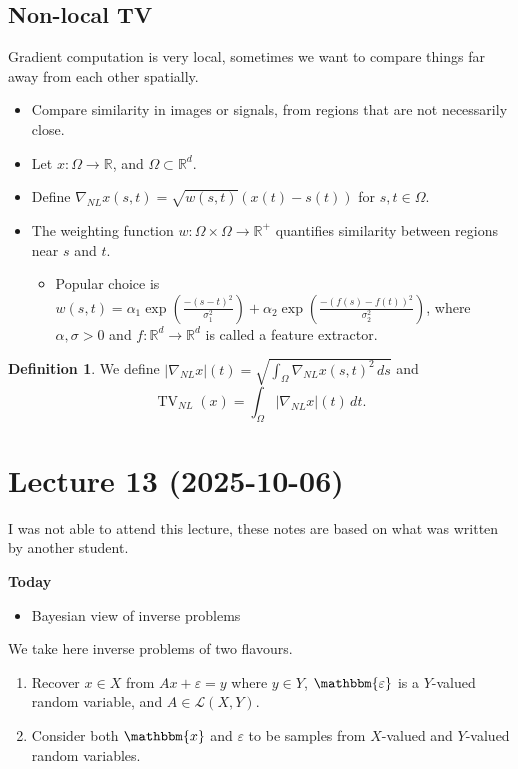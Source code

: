 \documentclass[12pt]{article}
\theoremstyle{definition}
\newtheorem{definition}{Definition}[section]
\newcommand{\real}{\mathbb{R}}   %
\newcommand{\abs}[1]{\left|#1\right|}
\DeclareMathOperator{\TV}{TV}
\begin{document}
\subsection{Non-local TV}
Gradient computation is very local, sometimes we want to compare things far away from each other spatially. 
\begin{itemize}
    \item Compare similarity in images or signals, from regions that are not necessarily close. 
    \item Let $x:\Omega\to\real$, and $\Omega\subset \real^d$. 
    \item Define $\nabla_{NL}x(s,t) = \sqrt{w(s,t)}(x(t)-s(t))$ for $s,t\in\Omega$.
    \item The weighting function $w:\Omega\times\Omega\to\real^+$ quantifies similarity between regions near $s$ and $t$. 
    \begin{itemize}
        \item Popular choice is $w(s,t) = \alpha_1\exp\left(\frac{-(s-t)^2}{\sigma_1^2}\right)+ \alpha_2 \exp\left(\frac{-(f(s)-f(t))^2}{\sigma_2^2}\right)$, where $\alpha,\sigma>0$ and $f:\real^d\to \real^d$ is called a feature extractor.
    \end{itemize}
\end{itemize}
\begin{definition}
    We define $\abs{\nabla_{NL}x}(t) = \sqrt{\int_\Omega \nabla_{NL}x(s,t)^2\, ds}$ and 
    \begin{equation*}
        \TV_{NL}(x) = \int_\Omega \abs{\nabla_{NL}x}(t)\, dt.
    \end{equation*}
\end{definition}


\newpage
\section{Lecture 13 (2025-10-06)}
I was not able to attend this lecture, these notes are based on what was written by another student.

\textbf{Today}
\begin{itemize}
    \item Bayesian view of inverse problems
\end{itemize}

We take here inverse problems of two flavours.
\begin{enumerate}[label=(\roman*)]
    \item Recover $x\in X$ from $Ax + \varepsilon = y$ where $y\in Y$, $\mathbbm{\varepsilon}$ is a $Y$-valued random variable, and $A\in\mathcal{L}(X,Y)$.
    \item Consider both $\mathbbm{x}$ and $\mathbb{\varepsilon}$ to be samples from $X$-valued and $Y$-valued random variables.
\end{enumerate}
\end{document}
